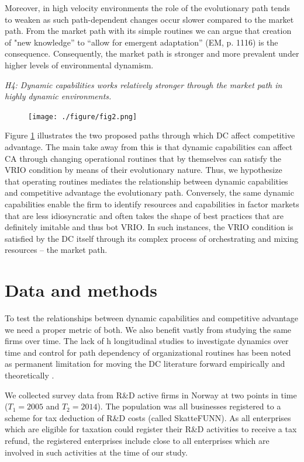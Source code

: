 \documentclass[review,fleqn]{elsarticle}\usepackage[]{graphicx}\usepackage[]{color}
\begin{document}
Moreover, in high velocity environments the role of the evolutionary path tends to
weaken as such path-dependent changes occur slower compared to the market path. From the
market path with its simple routines we can argue that creation of "new knowledge” to
“allow for emergent adaptation” (EM, p. 1116) is the consequence. Consequently, the market
path is stronger and more prevalent under higher levels of environmental dynamism.

\emph{H4: Dynamic capabilities works relatively stronger through the market path in highly
dynamic environments.}


\begin{figure}
  \centering
  \captionsetup{width=0.5\linewidth}
  \texttt{[image: ./figure/fig2.png]}
  \label{fig:fig2}
\end{figure}

Figure \ref{fig:fig2} illustrates the two proposed paths through which DC affect
competitive advantage. The main take away from this is that dynamic capabilities can
affect CA through changing operational routines that by themselves can satisfy the VRIO
condition by means of their evolutionary nature. Thus, we hypothesize that operating
routines mediates the relationship between dynamic capabilities and competitive advantage
the evolutionary path. Conversely, the same dynamic capabilities enable the firm to
identify resources and capabilities in factor markets that are less idiosyncratic and
often takes the shape of best practices that are definitely imitable and thus bot VRIO. In
such instances, the VRIO condition is satisfied by the DC itself through its complex
process of orchestrating and mixing resources – the market path.


\section{Data and methods}

To test the relationships between dynamic capabilities and competitive advantage we need a
proper metric of both. We also benefit vastly from studying the same firms over time.  The
lack of h longitudinal studies to investigate dynamics over time and control for path
dependency of organizational routines has been noted as permanent limitation for moving
the DC literature forward empirically and theoretically \cite{Schilke2018}.

We collected survey data from R\&D active firms in Norway at two points in time
($T_1=2005$ and $T_2=2014$). The population was all businesses registered to a scheme for
tax deduction of R\&D costs (called SkatteFUNN). As all enterprises which are eligible for
taxation could register their R\&D activities to receive a tax refund, the registered
enterprises include close to all enterprises which are involved in such activities at the
time of our study.
\end{document}
